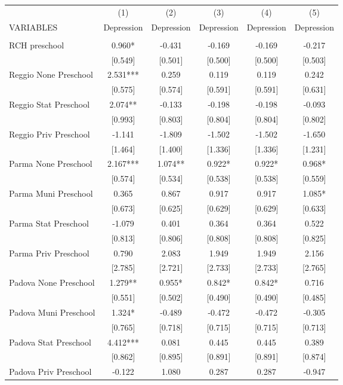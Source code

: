 \begin{tabular}{lccccc} \hline
 & (1) & (2) & (3) & (4) & (5) \\
VARIABLES & Depression & Depression & Depression & Depression & Depression \\ \hline
 &  &  &  &  &  \\
RCH preschool & 0.960* & -0.431 & -0.169 & -0.169 & -0.217 \\
 & [0.549] & [0.501] & [0.500] & [0.500] & [0.503] \\
Reggio None Preschool & 2.531*** & 0.259 & 0.119 & 0.119 & 0.242 \\
 & [0.575] & [0.574] & [0.591] & [0.591] & [0.631] \\
Reggio Stat Preschool & 2.074** & -0.133 & -0.198 & -0.198 & -0.093 \\
 & [0.993] & [0.803] & [0.804] & [0.804] & [0.802] \\
Reggio Priv Preschool & -1.141 & -1.809 & -1.502 & -1.502 & -1.650 \\
 & [1.464] & [1.400] & [1.336] & [1.336] & [1.231] \\
Parma None Preschool & 2.167*** & 1.074** & 0.922* & 0.922* & 0.968* \\
 & [0.574] & [0.534] & [0.538] & [0.538] & [0.559] \\
Parma Muni Preschool & 0.365 & 0.867 & 0.917 & 0.917 & 1.085* \\
 & [0.673] & [0.625] & [0.629] & [0.629] & [0.633] \\
Parma Stat Preschool & -1.079 & 0.401 & 0.364 & 0.364 & 0.522 \\
 & [0.813] & [0.806] & [0.808] & [0.808] & [0.825] \\
Parma Priv Preschool & 0.790 & 2.083 & 1.949 & 1.949 & 2.156 \\
 & [2.785] & [2.721] & [2.733] & [2.733] & [2.765] \\
Padova None Preschool & 1.279** & 0.955* & 0.842* & 0.842* & 0.716 \\
 & [0.551] & [0.502] & [0.490] & [0.490] & [0.485] \\
Padova Muni Preschool & 1.324* & -0.489 & -0.472 & -0.472 & -0.305 \\
 & [0.765] & [0.718] & [0.715] & [0.715] & [0.713] \\
Padova Stat Preschool & 4.412*** & 0.081 & 0.445 & 0.445 & 0.389 \\
 & [0.862] & [0.895] & [0.891] & [0.891] & [0.874] \\
Padova Priv Preschool & -0.122 & 1.080 & 0.287 & 0.287 & -0.947 \\

\end{tabular}
